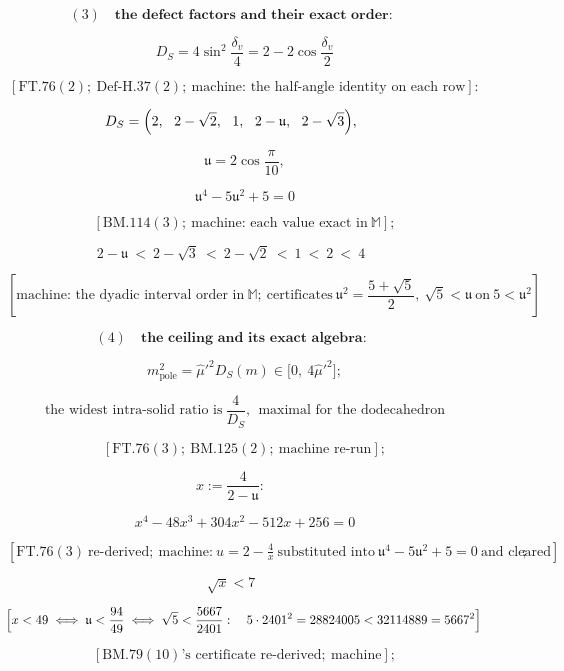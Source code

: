 \documentclass[11pt,openany]{report}
\theoremstyle{canonplain}
\theoremstyle{canondef}
\begin{document}
\[
(3)\quad\textbf{the defect factors and their exact order:}
\]

\[
\qquad D_S=4\sin^2\frac{\delta_v}4=2-2\cos\frac{\delta_v}2
\]

\[
\qquad [\mathrm{FT.76}(2);\ \mathrm{Def\text{-}H.37}(2);\ \text{machine: the half-angle identity on each row}]:
\]

\[
D_S=\Bigl(2,\ \ 2-\sqrt2,\ \ 1,\ \ 2-\mathfrak u,\ \ 2-\sqrt3\Bigr),
\]

\[
\qquad \mathfrak u=2\cos\frac\pi{10},
\]

\[
\qquad \mathfrak u^4-5\mathfrak u^2+5=0
\]

\[
\qquad [\mathrm{BM.114}(3);\ \text{machine: each value exact in}\ \mathbb M];
\]

\[
\boxed{\ 2-\mathfrak u\ <\ 2-\sqrt3\ <\ 2-\sqrt2\ <\ 1\ <\ 2\ <\ 4\ }
\]

\[
\qquad [\text{machine: the dyadic interval order in}\ \mathbb M;\ \text{certificates}\ \mathfrak u^2=\frac{5+\sqrt5}2,\ \sqrt5<\mathfrak u\ \text{on}\ 5<\mathfrak u^2]
\]

\[
(4)\quad\textbf{the ceiling and its exact algebra:}
\]

\[
\qquad m^2_{\mathrm{pole}}=\hat\mu'^2D_S(m)\in\bigl[0,\ 4\hat\mu'^2\bigr];
\]

\[
\qquad \text{the widest intra-solid ratio is}\ \frac4{D_S},\ \ \text{maximal for the dodecahedron}
\]

\[
\qquad [\mathrm{FT.76}(3);\ \mathrm{BM.125}(2);\ \text{machine re-run}];
\]

\[
x:=\frac4{2-\mathfrak u}:
\]

\[
\qquad \boxed{\ x^4-48x^3+304x^2-512x+256=0\ }
\]

\[
\qquad [\mathrm{FT.76}(3)\ \text{re-derived};\ \text{machine:}\ u=2-\tfrac4x\ \text{substituted into}\ \mathfrak u^4-5\mathfrak u^2+5=0\ \text{and cleared}];
\]

\[
\sqrt x<7
\]

\[
\qquad \Bigl[x<49\iff\mathfrak u<\frac{94}{49}\iff\sqrt5<\frac{5667}{2401}:\quad5\cdot2401^2=28824005<32114889=5667^2\Bigr]
\]

\[
\qquad [\mathrm{BM.79}(10)\text{'s certificate re-derived};\ \text{machine}];
\]
\end{document}
